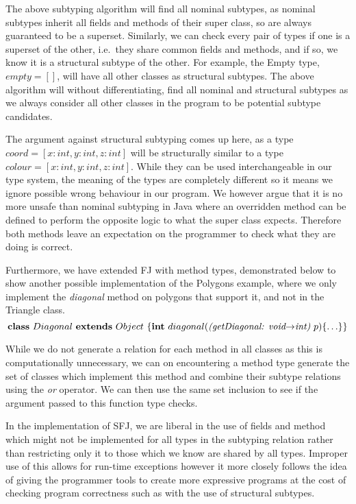 \documentclass[runningheads]{llncs}
\begin{document}
The above subtyping algorithm will find all nominal subtypes, as nominal subtypes inherit all fields
and methods of their super class, so are always guaranteed to be a superset. Similarly, we can check
every pair of types if one is a superset of the other, i.e.\ they share common fields and
methods, and if so, we know it is a structural subtype of the other. For example, the Empty type,
$empty = []$, will have all other classes as structural subtypes. The above algorithm will 
without differentiating, find all nominal and structural subtypes as we always consider all other
classes in the program to be potential subtype candidates.

The argument against structural subtyping comes up here, as a type $coord = [x:int, y:int, z:int]$ will be structurally similar to a type $colour = [x:int, y:int, z:int]$. While they can be used 
interchangeable in our type system, the meaning of the types are completely different so it means
we ignore possible wrong behaviour in our program. We however argue that it is no more unsafe than
nominal subtyping in Java where an overridden method can be defined to perform the opposite
logic to what the super class expects. Therefore both methods leave an expectation on the programmer
to check what they are doing is correct. 

Furthermore, we have extended FJ with method types, demonstrated below to show another possible
implementation of the Polygons example, where we only implement the \textit{diagonal} method on 
polygons that support it, and not in the Triangle class. 
$$
\mathbf{class} \  Diagonal \ \mathbf{extends }\  Object\ \{
	\mathbf{int}\ diagonal(\textit{(getDiagonal: void$\rightarrow$int)}  \ p)\{\ldots\}
\}
$$

While we do not generate a relation for each method in all classes as this is computationally 
unnecessary, we can on encountering a method type generate the set of classes which implement this
method and combine their subtype relations using the \textit{or} operator. We can then use the same set inclusion to see if the argument passed to this function type checks. 

In the implementation of SFJ, we are liberal in the use of fields and method which might not be 
implemented for all types in the subtyping relation rather than restricting only it to those which
we know are shared by all types. Improper use of this allows for run-time exceptions however it
more closely follows the idea of giving the programmer tools to create more expressive programs
at the cost of checking program correctness such as with the use of structural subtypes. 
\end{document}
